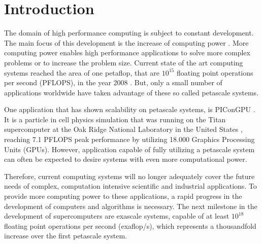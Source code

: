 \chapter{Introduction}
\label{sec:intro}



The domain of high performance computing is subject to constant
development.  The main focus of this development is the increase of
computing power \cite{ref}.  More computing power enables high performance
applications to solve more complex problems or to increase the problem
size.  Current state of the art computing systems reached the area of
one petaflop, that are $10^{15}$ floating point operations per second
(PFLOPS), in the year 2008 \cite{ref:ibm_roadrunner}. But, only a
small number of applications worldwide have taken advantage of these
so called petascale systems.

One application that has shown scalability on petascale systems, is
PIConGPU \cite{ref:picongpu_scale}. It is a particle in cell physics
simulation that was running on the Titan supercomputer at the Oak
Ridge National Laboratory in the United States \cite{ref:titan},
reaching 7.1 PFLOPS peak performance by utilizing 18.000 Graphics
Processing Units (GPUs). However, application capable of fully
utilizing a petascale system can often be expected to desire systems
with even more computational power.

Therefore, current computing systems will no longer adequately cover
the future needs of complex, computation intensive scientific and
industrial applications.  To provide more computing power to these
applications, a rapid progress in the development of computers and
algorithms is necessary. The next milestone in the development of
supercomputers are exascale systems, capable of at least $10^{18}$
floating point operations per second (exaflop/s), which represents a
thousandfold increase over the first petascale system.

